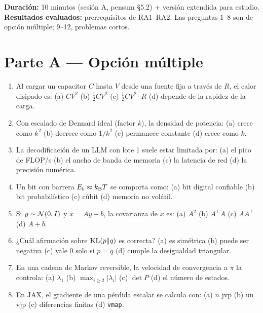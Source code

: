 \documentclass[11pt,a4paper]{article}
\begin{document}
\noindent\textbf{Duración:} 10 minutos (sesión A, pensum §5.2) + versión extendida para estudio.
\textbf{Resultados evaluados:} prerrequisitos de RA1--RA2. Las preguntas 1--8 son de opción múltiple; 9--12, problemas cortos.

\section*{Parte A — Opción múltiple}
\begin{enumerate}
\item Al cargar un capacitor $C$ hasta $V$ desde una fuente fija a través de $R$, el calor disipado es:
 (a) $CV^2$ \quad (b) $\tfrac12CV^2$ \quad (c) $\tfrac12CV^2\cdot R$ \quad (d) depende de la rapidez de la carga.
\item Con escalado de Dennard ideal (factor $k$), la densidad de potencia:
 (a) crece como $k^2$ \quad (b) decrece como $1/k^2$ \quad (c) permanece constante \quad (d) crece como $k$.
\item La decodificación de un LLM con lote 1 suele estar limitada por:
 (a) el pico de FLOP/s \quad (b) el ancho de banda de memoria \quad (c) la latencia de red \quad (d) la precisión numérica.
\item Un bit con barrera $E_b\approx k_{\mathrm B} T$ se comporta como:
 (a) bit digital confiable \quad (b) bit probabilístico \quad (c) cúbit \quad (d) memoria no volátil.
\item Si $y\sim\mathcal{N}(0,I)$ y $x=Ay+b$, la covarianza de $x$ es:
 (a) $A^2$ \quad (b) $A^\top A$ \quad (c) $AA^\top$ \quad (d) $A+b$.
\item ¿Cuál afirmación sobre $\operatorname{KL}(p\|q)$ es correcta?
 (a) es simétrica \quad (b) puede ser negativa \quad (c) vale 0 solo si $p=q$ \quad (d) cumple la desigualdad triangular.
\item En una cadena de Markov reversible, la velocidad de convergencia a $\pi$ la controla:
 (a) $\lambda_1$ \quad (b) $\max_{i\ge2}|\lambda_i|$ \quad (c) $\det P$ \quad (d) el número de estados.
\item En JAX, el gradiente de una pérdida escalar se calcula con:
 (a) $n$ jvp \quad (b) un vjp \quad (c) diferencias finitas \quad (d) \texttt{vmap}.
\end{enumerate}
\end{document}
